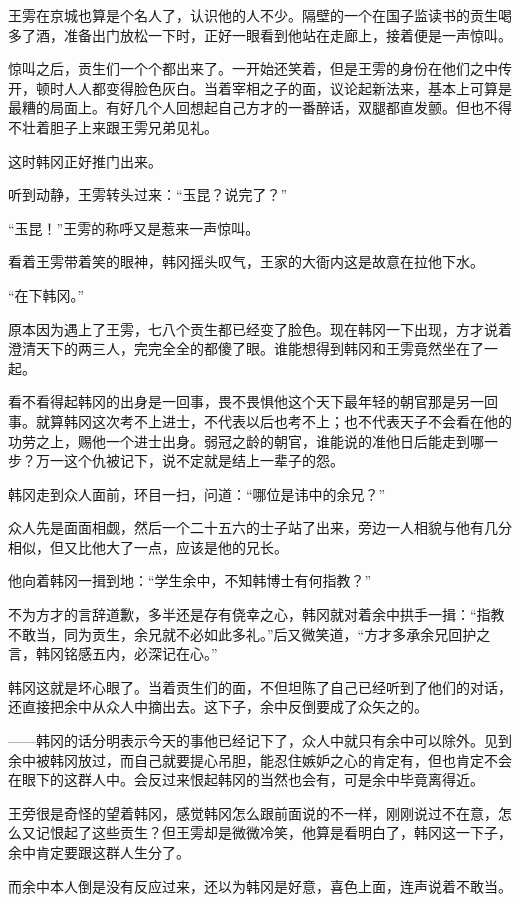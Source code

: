 王雱在京城也算是个名人了，认识他的人不少。隔壁的一个在国子监读书的贡生喝多了酒，准备出门放松一下时，正好一眼看到他站在走廊上，接着便是一声惊叫。

惊叫之后，贡生们一个个都出来了。一开始还笑着，但是王雱的身份在他们之中传开，顿时人人都变得脸色灰白。当着宰相之子的面，议论起新法来，基本上可算是最糟的局面上。有好几个人回想起自己方才的一番醉话，双腿都直发颤。但也不得不壮着胆子上来跟王雱兄弟见礼。

这时韩冈正好推门出来。

听到动静，王雱转头过来：“玉昆？说完了？”

“玉昆！”王雱的称呼又是惹来一声惊叫。

看着王雱带着笑的眼神，韩冈摇头叹气，王家的大衙内这是故意在拉他下水。

“在下韩冈。”

原本因为遇上了王雱，七八个贡生都已经变了脸色。现在韩冈一下出现，方才说着澄清天下的两三人，完完全全的都傻了眼。谁能想得到韩冈和王雱竟然坐在了一起。

看不看得起韩冈的出身是一回事，畏不畏惧他这个天下最年轻的朝官那是另一回事。就算韩冈这次考不上进士，不代表以后也考不上；也不代表天子不会看在他的功劳之上，赐他一个进士出身。弱冠之龄的朝官，谁能说的准他日后能走到哪一步？万一这个仇被记下，说不定就是结上一辈子的怨。

韩冈走到众人面前，环目一扫，问道：“哪位是讳中的余兄？”

众人先是面面相觑，然后一个二十五六的士子站了出来，旁边一人相貌与他有几分相似，但又比他大了一点，应该是他的兄长。

他向着韩冈一揖到地：“学生余中，不知韩博士有何指教？”

不为方才的言辞道歉，多半还是存有侥幸之心，韩冈就对着余中拱手一揖：“指教不敢当，同为贡生，余兄就不必如此多礼。”后又微笑道，“方才多承余兄回护之言，韩冈铭感五内，必深记在心。”

韩冈这就是坏心眼了。当着贡生们的面，不但坦陈了自己已经听到了他们的对话，还直接把余中从众人中摘出去。这下子，余中反倒要成了众矢之的。

——韩冈的话分明表示今天的事他已经记下了，众人中就只有余中可以除外。见到余中被韩冈放过，而自己就要提心吊胆，能忍住嫉妒之心的肯定有，但也肯定不会在眼下的这群人中。会反过来恨起韩冈的当然也会有，可是余中毕竟离得近。

王旁很是奇怪的望着韩冈，感觉韩冈怎么跟前面说的不一样，刚刚说过不在意，怎么又记恨起了这些贡生？但王雱却是微微冷笑，他算是看明白了，韩冈这一下子，余中肯定要跟这群人生分了。

而余中本人倒是没有反应过来，还以为韩冈是好意，喜色上面，连声说着不敢当。

